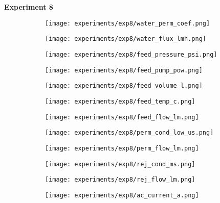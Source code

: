 \documentclass{article}
\begin{document}
    \pagebreak
    
    \textbf{Experiment 8}
    \begin{figure}[H]
        \centering
        \begin{subfigure}{0.48\linewidth}
		    \texttt{[image: experiments/exp8/water\_perm\_coef.png]}
	    \end{subfigure}
	    \begin{subfigure}{0.48\linewidth}
		    \texttt{[image: experiments/exp8/water\_flux\_lmh.png]}
	    \end{subfigure}
	    \begin{subfigure}{0.48\linewidth}
		    \texttt{[image: experiments/exp8/feed\_pressure\_psi.png]}
	    \end{subfigure}
	    \begin{subfigure}{0.48\linewidth}
		    \texttt{[image: experiments/exp8/feed\_pump\_pow.png]}
	    \end{subfigure}
	    \begin{subfigure}{0.48\linewidth}
		    \texttt{[image: experiments/exp8/feed\_volume\_l.png]}
	    \end{subfigure}
	    \begin{subfigure}{0.48\linewidth}
		    \texttt{[image: experiments/exp8/feed\_temp\_c.png]}
	    \end{subfigure}
	    \begin{subfigure}{0.48\linewidth}
		    \texttt{[image: experiments/exp8/feed\_flow\_lm.png]}
	    \end{subfigure}
	    \begin{subfigure}{0.48\linewidth}
		    \texttt{[image: experiments/exp8/perm\_cond\_low\_us.png]}
	    \end{subfigure}
	    \begin{subfigure}{0.48\linewidth}
		    \texttt{[image: experiments/exp8/perm\_flow\_lm.png]}
	    \end{subfigure}
	    \begin{subfigure}{0.48\linewidth}
		    \texttt{[image: experiments/exp8/rej\_cond\_ms.png]}
	    \end{subfigure}
	    \begin{subfigure}{0.48\linewidth}
		    \texttt{[image: experiments/exp8/rej\_flow\_lm.png]}
	    \end{subfigure}
	    \begin{subfigure}{0.48\linewidth}
		    \texttt{[image: experiments/exp8/ac\_current\_a.png]}
	    \end{subfigure}
    \end{figure}
\end{document}
